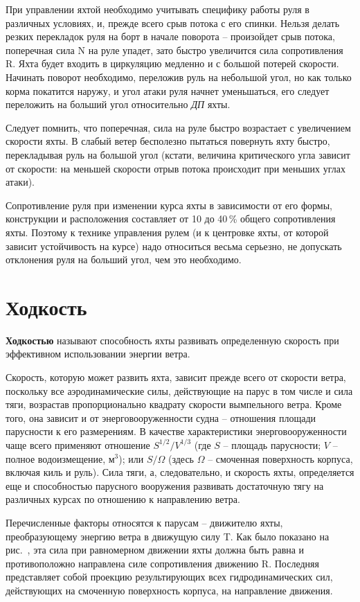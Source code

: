 При управлении яхтой необходимо учитывать специфику работы руля в различных условиях, и, прежде всего срыв потока с его спинки. Нельзя делать резких перекладок руля на борт в начале поворота \--- произойдет срыв потока, поперечная сила \ve N на руле упадет, зато быстро увеличится сила сопротивления \ve R. Яхта будет входить в циркуляцию медленно и с большой потерей скорости. Начинать поворот необходимо, переложив руль на небольшой угол, но как только корма покатится наружу, и угол атаки руля начнет уменьшаться, его следует переложить на больший угол относительно \textit{ДП} яхты. 

Следует помнить, что поперечная, сила на руле быстро возрастает с увеличением скорости яхты. В слабый ветер бесполезно пытаться повернуть яхту быстро, перекладывая руль на большой угол (кстати, величина критического угла зависит от скорости: на меньшей скорости отрыв потока происходит при меньших углах атаки).

Сопротивление руля при изменении курса яхты в зависимости от его формы, конструкции и расположения составляет от 10 до 40\,\% общего сопротивления яхты. Поэтому к технике управления рулем (и к центровке яхты, от которой зависит устойчивость на курсе) надо относиться весьма серьезно, не допускать отклонения руля на больший угол, чем это необходимо.

\section{Ходкость}

\textbf{Ходкостью} называют способность яхты развивать определенную скорость при эффективном использовании энергии ветра.

Скорость, которую может развить яхта, зависит прежде всего от скорости ветра, поскольку все аэродинамические силы, действующие на парус в том числе и сила тяги, возрастав пропорционально квадрату скорости вымпельного ветра. Кроме того, она зависит и от энерговооруженности судна \--- отношения площади парусности к его размерениям. В качестве характеристики энерговооруженности чаще всего применяют отношение $S^{1/2} / V^{1/3}$
(где $S$ \--- площадь парусности\msq; $V$ \--- полное водоизмещение, м$^3$); или $S / \Omega$ 
(здесь $\Omega$ \--- смоченная поверхность корпуса, включая киль и руль). Сила тяги, а, следовательно, и скорость яхты, определяется еще и способностью парусного вооружения развивать достаточную тягу на различных курсах по отношению к направлению ветра.

Перечисленные факторы относятся к парусам \--- движителю яхты, преобразующему энергию ветра в движущую силу \ve T. Как было показано на рис.~, эта сила при равномерном движении яхты должна быть равна и противоположно направлена силе сопротивления движению \ve R. Последняя представляет собой проекцию результирующих всех гидродинамических сил, действующих на смоченную поверхность корпуса, на направление движения.


